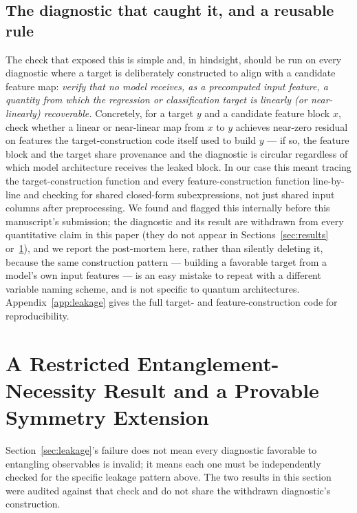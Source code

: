 \documentclass[journal]{IEEEtran}
\begin{document}
\subsection{The diagnostic that caught it, and a reusable rule}
The check that exposed this is simple and, in hindsight, should be run on every diagnostic where a target is deliberately constructed to align with a candidate feature map: \emph{verify that no model receives, as a precomputed input feature, a quantity from which the regression or classification target is linearly (or near-linearly) recoverable.} Concretely, for a target $y$ and a candidate feature block $x$, check whether a linear or near-linear map from $x$ to $y$ achieves near-zero residual on features the target-construction code itself used to build $y$ --- if so, the feature block and the target share provenance and the diagnostic is circular regardless of which model architecture receives the leaked block. In our case this meant tracing the target-construction function and every feature-construction function line-by-line and checking for shared closed-form subexpressions, not just shared input columns after preprocessing. We found and flagged this internally before this manuscript's submission; the diagnostic and its result are withdrawn from every quantitative claim in this paper (they do not appear in Sections~\ref{sec:results} or~\ref{sec:symmetry}), and we report the post-mortem here, rather than silently deleting it, because the same construction pattern --- building a favorable target from a model's own input features --- is an easy mistake to repeat with a different variable naming scheme, and is not specific to quantum architectures. Appendix~\ref{app:leakage} gives the full target- and feature-construction code for reproducibility.

\section{A Restricted Entanglement-Necessity Result and a Provable Symmetry Extension}
\label{sec:symmetry}
Section~\ref{sec:leakage}'s failure does not mean every diagnostic favorable to entangling observables is invalid; it means each one must be independently checked for the specific leakage pattern above. The two results in this section were audited against that check and do not share the withdrawn diagnostic's construction.
\end{document}
